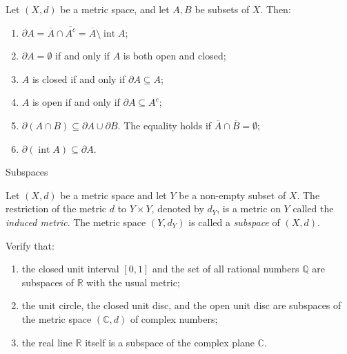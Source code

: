 \documentclass[12pt, a4paper]{article}
\begin{document}
\begin{theorem}
Let $(X,d)$ be a metric space, and let $A,B$ be subsets of $X$. Then:
\begin{enumerate}
    \item $\partial A=\overline{A}\cap \overline{A^c}
    =\overline{A}\setminus \operatorname{int}A$;
    
    \item $\partial A=\emptyset$ if and only if $A$ is both open and closed;
    
    \item $A$ is closed if and only if $\partial A \subseteq A$;
    
    \item $A$ is open if and only if $\partial A \subseteq A^c$;
    
    \item $\partial (A\cap B)\subseteq \partial A\cup \partial B$.
    The equality holds if $\overline{A}\cap \overline{B}=\emptyset$;
    
    \item $\partial(\operatorname{int}A)\subseteq \partial A$.
\end{enumerate}
\end{theorem}

\clearpage


\begin{heading}
    Subspaces
\end{heading}

\vspace{10pt}

\begin{definition}
Let $(X,d)$ be a metric space and let $Y$ be a non-empty subset of $X$.
The restriction of the metric $d$ to $Y\times Y$, denoted by $d_Y$, is a metric on $Y$
called the \emph{induced metric}. The metric space $(Y,d_Y)$ is called a
\emph{subspace} of $(X,d)$.
\end{definition}

\vspace{100pt}

\begin{problem}
Verify that:
\begin{enumerate}
    \item the closed unit interval $[0,1]$ and the set of all rational numbers $\mathbb{Q}$
    are subspaces of $\mathbb{R}$ with the usual metric;
    \item the unit circle, the closed unit disc, and the open unit disc are subspaces of
    the metric space $(\mathbb{C},d)$ of complex numbers;
    \item the real line $\mathbb{R}$ itself is a subspace of the complex plane $\mathbb{C}$.
\end{enumerate}
\end{problem}
\end{document}
